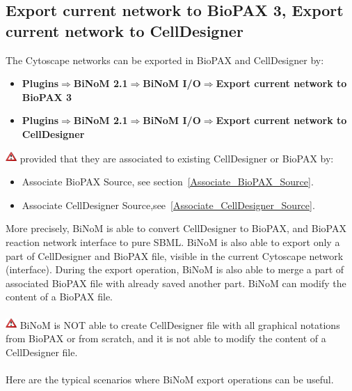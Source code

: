 \subsection{Export current network to BioPAX 3, Export current network to CellDesigner} \label{Export_current_network}
The Cytoscape networks can be exported in BioPAX and CellDesigner by:
\begin{itemize}
\item \textbf{Plugins$\Rightarrow$BiNoM 2.1$\Rightarrow$BiNoM I/O$\Rightarrow$Export current network to BioPAX 3}
\item \textbf{Plugins$\Rightarrow$BiNoM 2.1$\Rightarrow$BiNoM I/O$\Rightarrow$Export current network to CellDesigner}
\end{itemize}
\includegraphics[width=12pt,height=12pt]{graphics/warning} provided that they are associated to existing CellDesigner or BioPAX by:
\begin{itemize}
\item Associate BioPAX Source, see section~\ref{Associate_BioPAX_Source}.
\item Associate CellDesigner Source,see~\ref{Associate_CellDesigner_Source}.
\end{itemize}
More precisely, BiNoM is able to convert CellDesigner to BioPAX, and BioPAX reaction network interface to pure SBML. BiNoM is also able to export only a part of CellDesigner and BioPAX file, visible in the current Cytoscape network (interface). During the export operation, BiNoM is also able to merge a part of associated BioPAX file with already saved another part. BiNoM can modify the content of a BioPAX file. \\\\
\includegraphics[width=12pt,height=12pt]{graphics/warning} BiNoM is NOT able to create CellDesigner file with all graphical notations from BioPAX or from scratch, and it is not able to modify the content of a CellDesigner file.\\\\
Here are the typical scenarios where BiNoM export operations can be useful.
